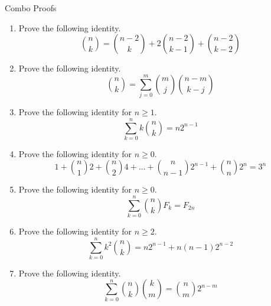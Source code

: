 \documentclass[11pt,letterpaper,boxed]{hmcpset}
\begin{document}
\begin{center}
    \LARGE{Combo Proofs}
\end{center}

\begin{enumerate}


\item
    Prove the following identity.
    $$\binom{n}{k}=\binom{n-2}{k}+2\binom{n-2}{k-1}+\binom{n-2}{k-2}$$


\item
    Prove the following identity.
    $$\binom{n}{k}=\sum_{j=0}^m\binom{m}{j}\binom{n-m}{k-j}$$


\item
    Prove the following identity for $n\geq1$.
    $$\sum_{k=0}^nk\binom{n}{k}=n2^{n-1}$$


\item
    Prove the following identity for $n\geq0$.
    $$1+\binom{n}{1}2+\binom{n}{2}4+\ldots+\binom{n}{n-1}2^{n-1}+\binom{n}{n}2^n=3^n$$


\item
    Prove the following identity for $n\geq0$.
    $$\sum_{k=0}^n\binom{n}{k}F_k=F_{2n}$$


\item
    Prove the following identity for $n\geq2$.
    $$\sum_{k=0}^nk^2\binom{n}{k}=n2^{n-1}+n(n-1)2^{n-2}$$


\item
    Prove the following identity.
    $$\sum_{k=0}^n\binom{n}{k}\binom{k}{m}=\binom{n}{m}2^{n-m}$$

\end{enumerate}
\end{document}
